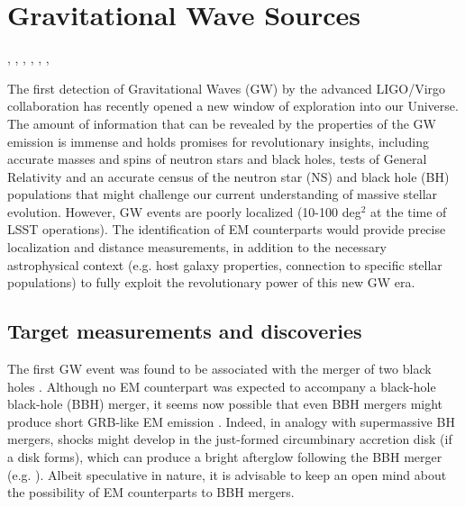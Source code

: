 %
%

\section{Gravitational Wave Sources}
\def\secname{\chpname:gw}\label{sec:\secname}

,
,
,
,
,
,

The first detection of Gravitational Waves (GW) by the advanced
LIGO/Virgo collaboration \citep{Abbott16, Abbott09, Acernese08} has
recently opened a new window of exploration into our Universe. The
amount of information that can be revealed by the properties of the GW
emission is immense and holds promises for revolutionary insights,
including accurate masses and spins of neutron stars and black holes,
tests of General Relativity and an accurate census of the neutron star
(NS) and black hole (BH) populations that might challenge our current
understanding of massive stellar evolution. However, GW events are
poorly localized (10-100 deg$^2$ at the time of LSST operations). The
identification of EM counterparts would provide precise localization and
distance measurements, in addition to the necessary astrophysical
context (e.g. host galaxy properties, connection to specific stellar
populations) to fully exploit the revolutionary power of this new GW
era.


\subsection{Target measurements and discoveries}
\label{sec:\secname:targets}

The first GW event was found to be associated with the merger of two
black holes \citep{Abbott16,Abbott16b}. Although no EM counterpart was
expected to accompany a black-hole black-hole (BBH) merger, it seems now
possible that even BBH mergers  might produce short GRB-like EM emission
\citep{Connaughton16,Loeb16,Zhang16,Perna16,Stone16}. Indeed, in
analogy with supermassive BH mergers, shocks might develop in the
just-formed circumbinary accretion disk (if a disk forms), which can
produce a bright afterglow following the BBH merger (e.g.
\citealt{Lippai08,Corrales10,Schnittman13}). Albeit speculative in
nature, it is advisable to keep an open mind about the possibility of EM
counterparts to BBH mergers.

